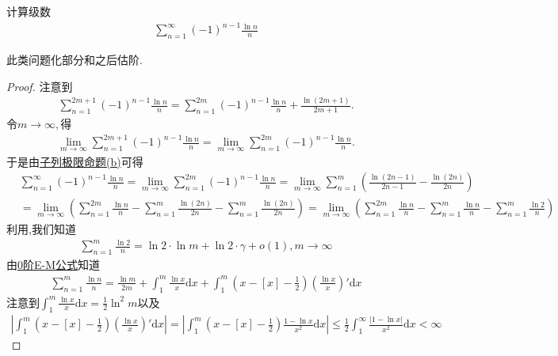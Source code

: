 \documentclass[../../main.tex]{subfiles}%
\begin{document}
\begin{example}
计算级数
\begin{align*}
\sum_{n=1}^{\infty} (-1)^{n - 1} \frac{\ln n}{n}
\end{align*}
\end{example}
\begin{note}
此类问题化部分和之后估阶.
\end{note}
\begin{proof}

注意到
\begin{align*}
\sum_{n=1}^{2m+1}{\left( -1 \right) ^{n-1}\frac{\ln n}{n}}=\sum_{n=1}^{2m}{\left( -1 \right) ^{n-1}\frac{\ln n}{n}}+\frac{\ln \left( 2m+1 \right)}{2m+1}.
\end{align*}
令$m\rightarrow \infty ,$得
\begin{align*}
\underset{m\rightarrow \infty}{\lim}\sum_{n=1}^{2m+1}{\left( -1 \right) ^{n-1}\frac{\ln n}{n}}=\underset{m\rightarrow \infty}{\lim}\sum_{n=1}^{2m}{\left( -1 \right) ^{n-1}\frac{\ln n}{n}}.
\end{align*}
于是由\hyperref[proposition:子列极限命题]{子列极限命题(b)}可得
\begin{align*}
&\sum_{n=1}^{\infty} (-1)^{n - 1} \frac{\ln n}{n} = \lim_{m \to \infty} \sum_{n=1}^{2m} (-1)^{n - 1} \frac{\ln n}{n} = \lim_{m \to \infty} \sum_{n=1}^{m} \left( \frac{\ln(2n - 1)}{2n - 1} - \frac{\ln(2n)}{2n} \right) \\
&= \lim_{m \to \infty} \left( \sum_{n=1}^{2m} \frac{\ln n}{n} - \sum_{n=1}^{m} \frac{\ln(2n)}{2n} - \sum_{n=1}^{m} \frac{\ln(2n)}{2n} \right) = \lim_{m \to \infty} \left( \sum_{n=1}^{2m} \frac{\ln n}{n} - \sum_{n=1}^{m} \frac{\ln n}{n} - \sum_{n=1}^{m} \frac{\ln 2}{n} \right)
\end{align*}
利用,我们知道
\begin{align*}
\sum_{n=1}^{m} \frac{\ln 2}{n} = \ln 2 \cdot \ln m + \ln 2 \cdot \gamma + o(1), m \to \infty
\end{align*}
由\hyperref[theorem:0阶Euler-Maclaurin公式(0阶E-M公式)]{0阶E-M公式}知道
\begin{align*}
\sum_{n=1}^{m} \frac{\ln n}{n} = \frac{\ln m}{2m} + \int_{1}^{m} \frac{\ln x}{x} \mathrm{d}x + \int_{1}^{m} \left( x - [x] - \frac{1}{2} \right) \left( \frac{\ln x}{x} \right)' \mathrm{d}x
\end{align*}
注意到$\int_{1}^{m} \frac{\ln x}{x} \mathrm{d}x = \frac{1}{2} \ln^2 m$以及
\begin{align*}
\left| \int_{1}^{m} \left( x - [x] - \frac{1}{2} \right) \left( \frac{\ln x}{x} \right)' \mathrm{d}x \right| = \left| \int_{1}^{m} \left( x - [x] - \frac{1}{2} \right) \frac{1 - \ln x}{x^2} \mathrm{d}x \right| \leqslant \frac{1}{2} \int_{1}^{\infty} \frac{|1 - \ln x|}{x^2} \mathrm{d}x < \infty

\end{align*}
\end{proof}
\end{document}
